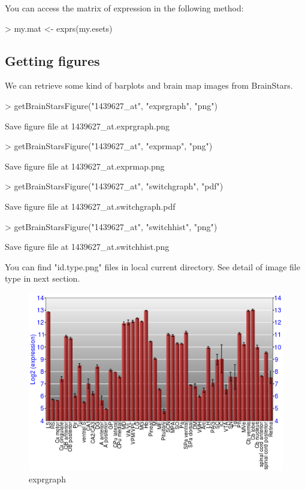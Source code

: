 \documentclass[12pt,fullpage]{article}
\begin{document}
You can access the matrix of expression in the following method:
\begin{Schunk}
\begin{Sinput}
> my.mat <- exprs(my.esets)
\end{Sinput}
\end{Schunk}

\subsection{Getting figures}
We can retrieve some kind of barplots and brain map images from BrainStars.

\begin{Schunk}
\begin{Sinput}
> getBrainStarsFigure("1439627_at", "exprgraph",   "png")
\end{Sinput}
\begin{Soutput}
Save figure file at 1439627_at.exprgraph.png 
\end{Soutput}
\begin{Sinput}
> getBrainStarsFigure("1439627_at", "exprmap",     "png")
\end{Sinput}
\begin{Soutput}
Save figure file at 1439627_at.exprmap.png 
\end{Soutput}
\begin{Sinput}
> getBrainStarsFigure("1439627_at", "switchgraph", "pdf")
\end{Sinput}
\begin{Soutput}
Save figure file at 1439627_at.switchgraph.pdf 
\end{Soutput}
\begin{Sinput}
> getBrainStarsFigure("1439627_at", "switchhist",  "png")
\end{Sinput}
\begin{Soutput}
Save figure file at 1439627_at.switchhist.png 
\end{Soutput}
\end{Schunk}

You can find "id.type.png" files in local current directory. See detail of image file type in next section.

\begin{figure}
  \centering
  \includegraphics{exprgraph.png}
  \caption{exprgraph}
\end{figure}
\end{document}
